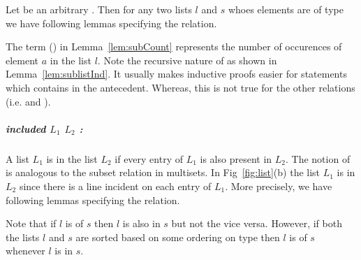 \documentclass[a4paper,UKenglish,cleveref, autoref]{lipics-v2019}
\begin{document}
Let  be an arbitrary . Then for any two lists $l$ and $s$ whoes elements are of type  we have following lemmas specifying the  relation.

\begin{lemma} 
\end{lemma}
\begin{lemma}\label{lem:sublistInd} 
\end{lemma}
\begin{lemma}\label{lem:subCount} 
\end{lemma}
The term (\emph{}) in Lemma~\ref{lem:subCount}  represents the number of occurences of element $a$ in the list $l$. Note the recursive nature of  as shown in Lemma~\ref{lem:sublistInd}. It usually makes inductive proofs easier for statements which contains  in the antecedent. Whereas, this is  not true for the other relations (i.e.  and ).

\subparagraph*{included $L_1$ $L_2$ :} A list $L_1$ is  in the list $L_2$ if every entry of $L_1$ is also present in $L_2$. The notion of   is analogous to the subset relation in multisets. In Fig~\ref{fig:list}(b) the list $L_1$ is  in $L_2$ since there is a line incident on each entry of $L_1$. More precisely, we have following lemmas specifying the  relation.
\begin{lemma}
\end{lemma}
\begin{lemma}
\end{lemma}
\begin{lemma}
\end{lemma}

Note that if $l$ is  of $s$ then $l$ is also  in $s$ but not the vice versa. However, if both the lists $l$ and $s$ are sorted based on some ordering on type  then $l$ is  of $s$ whenever $l$ is  in $s$.
\begin{lemma}
\end{lemma}
\end{document}
